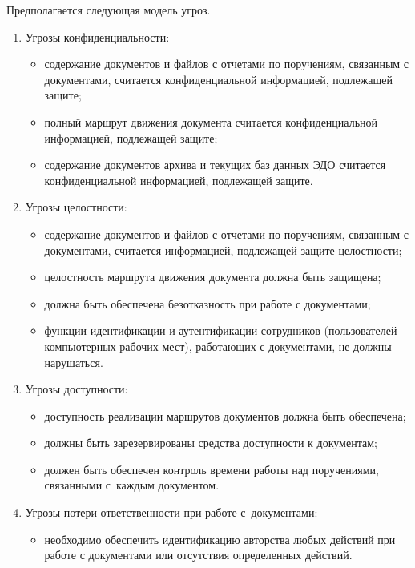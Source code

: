 \begin{multicols}{2}
  Предполагается следующая модель угроз.
  \begin{enumerate}[1.]
  \item Угрозы конфиденциальности:
  \begin{itemize}
\item содержание документов и файлов с отчетами по поручениям, 
связанным с документами, считается конфиденциальной информацией, 
подлежащей защите;
\item полный маршрут движения документа считается конфиденциальной 
информацией, подлежащей защите;
\item содержание документов архива и текущих баз данных ЭДО считается 
конфиденциальной информацией, подлежащей защите.
\end{itemize}
  \item Угрозы целостности:
  \begin{itemize}
\item содержание документов и файлов с отчетами по поручениям, 
связанным с документами, считается информацией, подлежащей защите 
целостности;
\item целостность маршрута движения документа должна быть защищена;
\item должна быть обеспечена безотказность при работе с документами;
\item функции идентификации и аутентификации сотрудников 
(пользователей компьютерных рабочих мест), работающих с документами, 
не должны нарушаться.
\end{itemize}
  \item Угрозы доступности:
  \begin{itemize}
\item доступность реализации маршрутов документов должна быть 
обеспечена; 
\item должны быть зарезервированы средства доступности к 
документам;
\item должен быть обеспечен контроль времени работы над поручениями, 
связанными с~каж\-дым документом.
\end{itemize}
  \item Угрозы потери ответственности при работе с~документами:
  \begin{itemize}
  \item необходимо обеспечить идентификацию авторства любых действий при 
работе с документами или отсутствия определенных действий.
  \end{itemize}
  
\end{enumerate}


\end{multicols}
